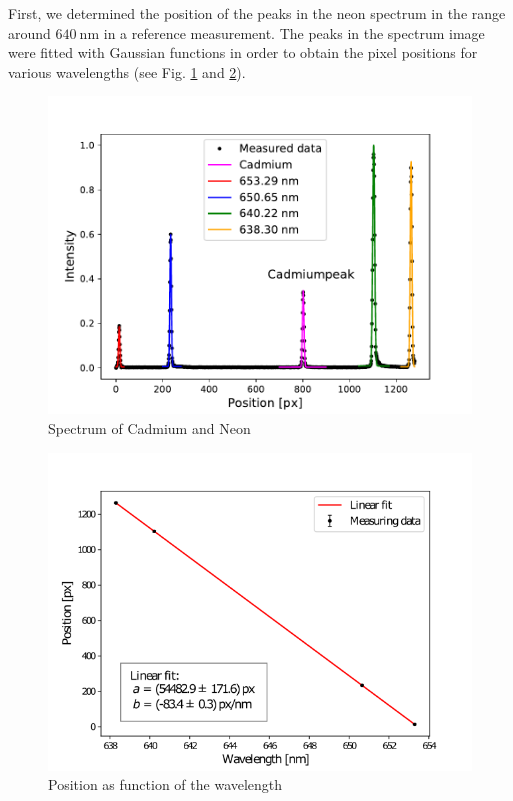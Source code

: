 First, we determined the position of the peaks in the neon spectrum in the range around $\SI{640}{\nano\meter}$ in a reference measurement.
The peaks in the spectrum image were fitted with Gaussian functions in order to obtain the pixel positions for various wavelengths (see Fig. \ref{fig:spectrum} and \ref{fig:position}).
\begin{figure}[ht]
\centering
\includegraphics[scale=.55]{images//spectrum.pdf}
\caption{Spectrum of Cadmium and Neon}
\label{fig:spectrum}
\end{figure}
\begin{figure}[ht]
\centering
\includegraphics[scale=.55]{images//position.png}
\caption{Position as function of the wavelength}
\label{fig:position}
\end{figure}
